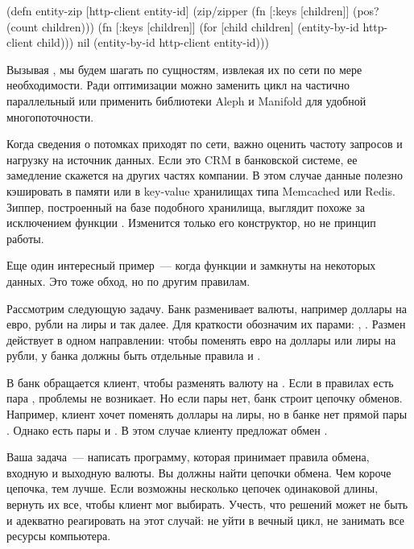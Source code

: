 \begin{english}
  \begin{clojure}
(defn entity-zip [http-client entity-id]
  (zip/zipper (fn [{:keys [children]}]
                (pos? (count children)))
              (fn [{:keys [children]}]
                (for [child children]
                  (entity-by-id http-client child)))
              nil
              (entity-by-id http-client entity-id)))
  \end{clojure}
\end{english}

Вызывая , мы будем шагать по сущностям, извлекая их по сети по мере
необходимости. Ради оптимизации можно заменить цикл  на частично
параллельный  или применить библиотеки Aleph и Manifold для удобной
многопоточности.

Когда сведения о потомках приходят по сети, важно оценить частоту запросов и
нагрузку на источник данных. Если это CRM в банковской системе, ее замедление
скажется на других частях компании. В этом случае данные полезно кэшировать в
памяти или в key-value хранилищах типа Memcached или Redis. Зиппер, построенный
на базе подобного хранилища, выглядит похоже за исключением функции
. Изменится только его конструктор, но не принцип работы.

Еще один интересный пример~--- когда функции  и  замкнуты на
некоторых данных. Это тоже обход, но по другим правилам.

Рассмотрим следующую задачу. Банк разменивает валюты, например доллары на евро,
рубли на лиры и так далее. Для краткости обозначим их парами: ,
. Размен действует в одном направлении: чтобы поменять евро на
доллары или лиры на рубли, у банка должны быть отдельные правила  и
.

В банк обращается клиент, чтобы разменять валюту  на . Если в правилах
есть пара , проблемы не возникает. Но если пары нет, банк строит цепочку
обменов. Например, клиент хочет поменять доллары на лиры, но в банке нет прямой
пары . Однако есть пары  и . В этом случае
клиенту предложат обмен  \arr {} \arr {}.

Ваша задача~--- написать программу, которая принимает правила обмена, входную и
выходную валюты. Вы должны найти цепочки обмена. Чем короче цепочка, тем
лучше. Если возможны несколько цепочек одинаковой длины, вернуть их все, чтобы
клиент мог выбирать. Учесть, что решений может не быть и адекватно реагировать
на этот случай: не уйти в вечный цикл, не занимать все ресурсы компьютера.

